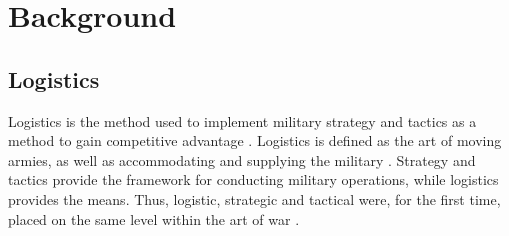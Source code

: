 \section{Background}
\label{sec:Theory}


\subsection{Logistics}


Logistics is the method used to implement military strategy and tactics as a method to gain competitive advantage \cite{rutner2012}. Logistics is defined as the art of moving armies, as well as accommodating and supplying the military \cite{prebilic2006}. Strategy and tactics provide the framework for conducting military operations, while logistics provides the means. Thus, logistic, strategic and tactical were, for the first time, placed on the same level within the art of war \cite{marques2014}.


